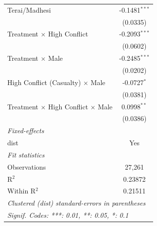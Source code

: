 \begin{tabular}{lc}
   Terai/Madhesi                                    & -0.1481$^{***}$\\   
                                                    & (0.0335)\\   
   Treatment $\times$ High Conflict                 & -0.2093$^{***}$\\   
                                                    & (0.0602)\\   
   Treatment $\times$ Male                          & -0.2485$^{***}$\\   
                                                    & (0.0202)\\   
   High Conflict (Casualty) $\times$ Male           & -0.0727$^{*}$\\   
                                                    & (0.0381)\\   
   Treatment $\times$ High Conflict $\times$ Male   & 0.0998$^{**}$\\   
                                                    & (0.0386)\\   
   \midrule
   \emph{Fixed-effects}\\
   dist                                             & Yes\\  
   \midrule
   \emph{Fit statistics}\\
   Observations                                     & 27,261\\  
   R$^2$                                            & 0.23872\\  
   Within R$^2$                                     & 0.21511\\  
   \midrule \midrule
   \multicolumn{2}{l}{\emph{Clustered (dist) standard-errors in parentheses}}\\
   \multicolumn{2}{l}{\emph{Signif. Codes: ***: 0.01, **: 0.05, *: 0.1}}\\
\end{tabular}
\par\endgroup


